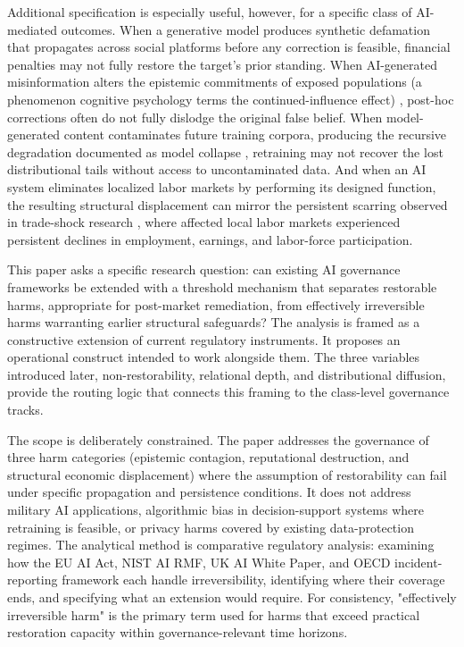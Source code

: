 \documentclass[11pt]{article}
\begin{document}
Additional specification is especially useful, however, for a specific class of AI-mediated outcomes. When a generative model produces synthetic defamation that propagates across social platforms before any correction is feasible, financial penalties may not fully restore the target's prior standing. When AI-generated misinformation alters the epistemic commitments of exposed populations (a phenomenon cognitive psychology terms the continued-influence effect) \parencite{ecker2022,lewandowsky2012}, post-hoc corrections often do not fully dislodge the original false belief. When model-generated content contaminates future training corpora, producing the recursive degradation documented as model collapse \parencite{shumailov2024}, retraining may not recover the lost distributional tails without access to uncontaminated data. And when an AI system eliminates localized labor markets by performing its designed function, the resulting structural displacement can mirror the persistent scarring observed in trade-shock research \parencite{autor2013}, where affected local labor markets experienced persistent declines in employment, earnings, and labor-force participation.

This paper asks a specific research question: can existing AI governance frameworks be extended with a threshold mechanism that separates restorable harms, appropriate for post-market remediation, from effectively irreversible harms warranting earlier structural safeguards? The analysis is framed as a constructive extension of current regulatory instruments. It proposes an operational construct intended to work alongside them. The three variables introduced later, non-restorability, relational depth, and distributional diffusion, provide the routing logic that connects this framing to the class-level governance tracks.

The scope is deliberately constrained. The paper addresses the governance of three harm categories (epistemic contagion, reputational destruction, and structural economic displacement) where the assumption of restorability can fail under specific propagation and persistence conditions. It does not address military AI applications, algorithmic bias in decision-support systems where retraining is feasible, or privacy harms covered by existing data-protection regimes. The analytical method is comparative regulatory analysis: examining how the EU AI Act, NIST AI RMF, UK AI White Paper, and OECD incident-reporting framework each handle irreversibility, identifying where their coverage ends, and specifying what an extension would require. For consistency, "effectively irreversible harm" is the primary term used for harms that exceed practical restoration capacity within governance-relevant time horizons.
\end{document}

